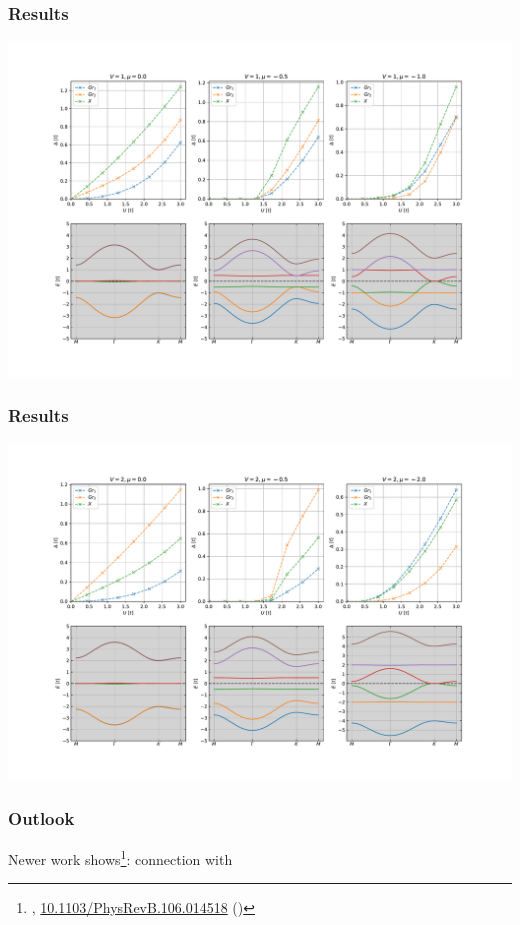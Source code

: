 \documentclass[aspectratio=169]{beamer}
\begin{document}
\begin{frame}
	\frametitle{Results}
	
	\begin{center}
		\includegraphics[width=0.75\linewidth]{figs/gap_size_vs_U_egx_uniform_U_V_1}
	\end{center}
\end{frame}

\begin{frame}
	\frametitle{Results}
	
	\begin{center}
		\includegraphics[width=0.75\linewidth]{figs/gap_size_vs_U_egx_uniform_U_V_2}
	\end{center}
\end{frame}


\begin{frame}
	\frametitle{Outlook}
	
	Newer work shows\footnote[frame]{\citeauthor{huhtinenRevisitingFlatBand2022}, \href{https://doi.org/10.1103/PhysRevB.106.014518}{10.1103/PhysRevB.106.014518} (\citeyear{huhtinenRevisitingFlatBand2022})}: connection with 
\end{frame}
\end{document}
